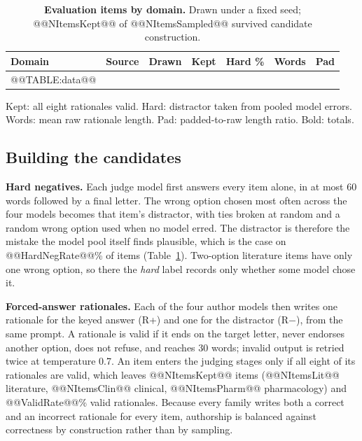 \documentclass[conference]{IEEEtran}
\begin{document}
\begin{table}[t]
\centering
\footnotesize
\caption{\textbf{Evaluation items by domain.} Drawn under a fixed seed; @@NItemsKept@@ of @@NItemsSampled@@ survived candidate construction.}
\label{tab:evaluation-items}
\setlength{\tabcolsep}{3.5pt}
\begin{threeparttable}
\begin{tabular}{@{}llrrrrr@{}}
\toprule
\textbf{Domain} & \textbf{Source} & \textbf{Drawn} & \textbf{Kept} & \textbf{Hard \%} & \textbf{Words} & \textbf{Pad} \\
\midrule
@@TABLE:data@@
\bottomrule
\end{tabular}
\begin{tablenotes}[flushleft]
\scriptsize\raggedright
\item Kept: all eight rationales valid. Hard: distractor taken from pooled model errors. Words: mean raw rationale length. Pad: padded-to-raw length ratio. Bold: totals.
\end{tablenotes}
\end{threeparttable}
\end{table}

\subsection{Building the candidates}
\textbf{Hard negatives.} Each judge model first answers every item alone, in at most 60 words followed by a final letter. The wrong option chosen most often across the four models becomes that item's distractor, with ties broken at random and a random wrong option used when no model erred. The distractor is therefore the mistake the model pool itself finds plausible, which is the case on @@HardNegRate@@\% of items (Table~\ref{tab:evaluation-items}). Two-option literature items have only one wrong option, so there the \emph{hard} label records only whether some model chose it.

\textbf{Forced-answer rationales.} Each of the four author models then writes one rationale for the keyed answer (R+) and one for the distractor (R$-$), from the same prompt. A rationale is valid if it ends on the target letter, never endorses another option, does not refuse, and reaches 30 words; invalid output is retried twice at temperature 0.7. An item enters the judging stages only if all eight of its rationales are valid, which leaves @@NItemsKept@@ items (@@NItemsLit@@ literature, @@NItemsClin@@ clinical, @@NItemsPharm@@ pharmacology) and @@ValidRate@@\% valid rationales. Because every family writes both a correct and an incorrect rationale for every item, authorship is balanced against correctness by construction rather than by sampling.
\end{document}
